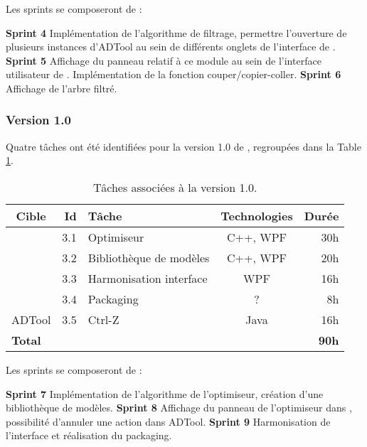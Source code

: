 			Les sprints se composeront de :
			
			\textbf{Sprint 4} Implémentation de l'algorithme de filtrage, permettre l'ouverture de plusieurs instances d'ADTool au sein de différents onglets de l'interface de \glasir{}.\newline 
			\textbf{Sprint 5} Affichage du panneau relatif à ce module au sein de l'interface utilisateur de \glasir{}. Implémentation de la fonction couper/copier-coller.\newline %
			\textbf{Sprint 6} Affichage de l'arbre filtré.

		\subsubsection{Version 1.0}
			Quatre tâches ont été identifiées pour la version 1.0 de \glasir{}, regroupées dans la {\sc Table} \ref{tab:taches_units_3}.
			\begin{table}[h]
				\centering
				\begin{tabular}{|c|r|l|c|r|}
					\hline
					\textbf{Cible} & \textbf{Id} & \textbf{Tâche} & \textbf{Technologies} & \textbf{Durée}\\
					\hline

					\multirow{4}{*}{\glasir{}} & 3.1 & Optimiseur & C++, WPF & 30h\\
					\cline{2-5}
					 & 3.2 & Bibliothèque de modèles & C++, WPF & 20h\\
					\cline{2-5}
					 & 3.3 & Harmonisation interface & WPF & 16h\\
					\cline{2-5}
					 & 3.4 & Packaging & ? & 8h\\
					\hline

					\multirow{1}{*}{ADTool} & 3.5 & Ctrl-Z & \multirow{1}{*}{Java} & 16h\\
					\hline

					\multicolumn{4}{|l|}{\bf Total} & {\bf 90h}\\
					\hline
				\end{tabular}
				\caption{Tâches associées à la version 1.0.}
				\label{tab:taches_units_3}
			\end{table}
			
			Les sprints se composeront de :		
			
			\textbf{Sprint 7} Implémentation de l'algorithme de l'optimiseur, création d'une bibliothèque de modèles.\newline
			\textbf{Sprint 8} Affichage du panneau de l'optimiseur dans \glasir{}, possibilité d'annuler une action dans ADTool.\newline
			\textbf{Sprint 9} Harmonisation de l'interface et réalisation du packaging. \newline

